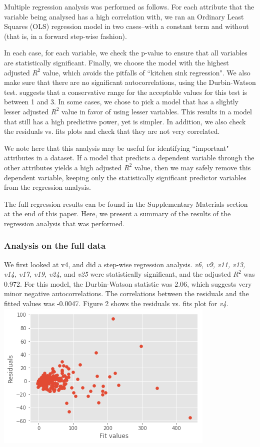 \documentclass[12pt,a4paper,twocolumn]{article}
\begin{document}
Multiple regression analysis was performed as follows. For each attribute that the variable being analysed has a high correlation with, we ran an Ordinary Least Squares (OLS) regression model in two cases--with a constant term and without (that is, in a forward step-wise fashion). 

In each case, for each variable, we check the p-value to ensure that all variables are statistically significant. Finally, we choose the model with the highest adjusted $R^2$ value, which avoids the pitfalls of ``kitchen sink regression". We also make sure that there are no significant autocorrelations, using the Durbin-Watson test. \cite{field2009discovering} suggests that a conservative range for the acceptable values for this test is between 1 and 3. In some cases, we chose to pick a model that has a slightly lesser adjusted $R^2$ value in favor of using lesser variables. This results in a model that still has a high predictive power, yet is simpler. In addition, we also check the residuals vs. fits plots and check that they are not very correlated. 

We note here that this analysis may be useful for identifying ``important" attributes in a dataset. If a model that predicts a dependent variable through the other attributes yields a high adjusted $R^2$ value, then we may safely remove this dependent variable, keeping only the statistically significant predictor variables from the regression analysis.

The full regression results can be found in the Supplementary Materials section at the end of this paper. Here, we present a summary of the results of the regression analysis that was performed.

\subsubsection{Analysis on the full data}
We first looked at v4, and did a step-wise regression analysis. \textit{v6, v9, v11, v13, v14, v17, v19, v24,} and \textit{v25} were statistically significant, and the adjusted $R^2$ was 0.972. For this model, the Durbin-Watson statistic was 2.06, which suggests very minor negative autocorrelations. The correlations between the residuals and the fitted values was -0.0047. Figure 2 shows the residuals vs. fits plot for \textit{v4}.\\

\includegraphics[scale=0.5]{fig2.png}
\begingroup
{}
\endgroup
\hfill\break
\end{document}
